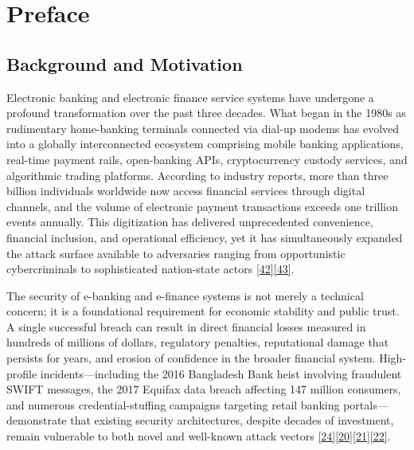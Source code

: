 \chapter*{Preface}
\label{ch:preface}

\section{Background and Motivation}

\indent Electronic banking and electronic finance service systems have undergone a profound transformation over the past three decades. What began in the 1980s as rudimentary home-banking terminals connected via dial-up modems has evolved into a globally interconnected ecosystem comprising mobile banking applications, real-time payment rails, open-banking APIs, cryptocurrency custody services, and algorithmic trading platforms. According to industry reports, more than three billion individuals worldwide now access financial services through digital channels, and the volume of electronic payment transactions exceeds one trillion events annually. This digitization has delivered unprecedented convenience, financial inclusion, and operational efficiency, yet it has simultaneously expanded the attack surface available to adversaries ranging from opportunistic cybercriminals to sophisticated nation-state actors \hyperref[ref:42]{[42]}\hyperref[ref:43]{[43]}.

\indent The security of e-banking and e-finance systems is not merely a technical concern; it is a foundational requirement for economic stability and public trust. A single successful breach can result in direct financial losses measured in hundreds of millions of dollars, regulatory penalties, reputational damage that persists for years, and erosion of confidence in the broader financial system. High-profile incidents---including the 2016 Bangladesh Bank heist involving fraudulent SWIFT messages, the 2017 Equifax data breach affecting 147 million consumers, and numerous credential-stuffing campaigns targeting retail banking portals---demonstrate that existing security architectures, despite decades of investment, remain vulnerable to both novel and well-known attack vectors \hyperref[ref:24]{[24]}\hyperref[ref:20]{[20]}\hyperref[ref:21]{[21]}\hyperref[ref:22]{[22]}.

